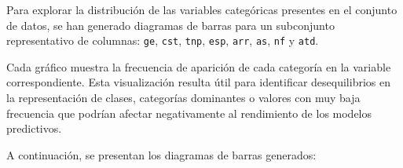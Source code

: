\documentclass[11pt,a4paper]{article}
\begin{document}
Para explorar la distribución de las variables categóricas presentes en el conjunto de datos, se han generado diagramas de barras para un subconjunto representativo de columnas: \texttt{ge}, \texttt{cst}, \texttt{tnp}, \texttt{esp}, \texttt{arr}, \texttt{as}, \texttt{nf} y \texttt{atd}.

\medskip

Cada gráfico muestra la frecuencia de aparición de cada categoría en la variable correspondiente. Esta visualización resulta útil para identificar desequilibrios en la representación de clases, categorías dominantes o valores con muy baja frecuencia que podrían afectar negativamente al rendimiento de los modelos predictivos.

\medskip

A continuación, se presentan los diagramas de barras generados:
\end{document}
